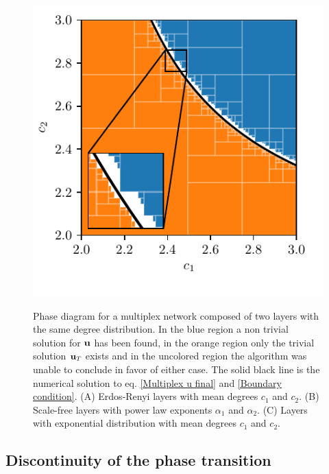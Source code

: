 \documentclass[
11pt, %
english, %
singlespacing, %
nolistspacing, %
liststotoc, %
headsepline, %
]{MastersDoctoralThesis} %
\begin{document}
\begin{figure}
{\begin{subfloatrow}
{		}{\caption{}}
	\end{subfloatrow}
	\begin{subfloatrow}
		{
			\capcorrection
			\includegraphics[scale=0.85]{critical_region_GeometricGraph_GeometricGraph.pdf}
		}{\caption{}}
	\end{subfloatrow}
	}{
	\caption{Phase diagram for a multiplex network composed of two layers with the same degree distribution. In the blue region a non trivial solution for $\boldsymbol{\mathrm{u}}$ has been found, in the orange region only the trivial solution $\boldsymbol{\mathrm{u}}_T$ exists and in the uncolored region the algorithm was unable to conclude in favor of either case. The solid black line is the numerical solution to eq. \eqref{Multiplex u final} and \eqref{Boundary condition}. (A) Erdos-Renyi layers with mean degrees $c_1$ and $c_2$. (B) Scale-free layers with power law exponents $\alpha_1$ and $\alpha_2$. (C) Layers with exponential distribution with mean degrees $c_1$ and $c_2$.}
	\label{Figure: Regions and boundary}
	}
\end{figure}

\subsection{Discontinuity of the phase transition}
\label{Section: Discontinuous phase transition}
\end{document}
